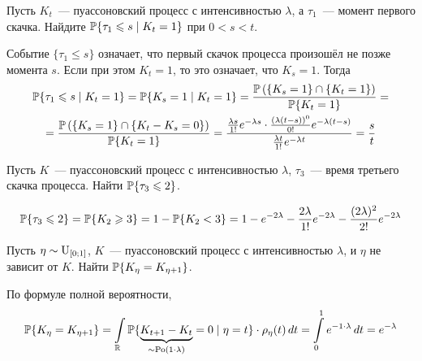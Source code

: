 \begin{exercise}
    \label{exercise:special:Poisson_process_first_event_conditional}
    Пусть $ K_t $~--- пуассоновский процесс с интенсивностью $ \lambda $,
    а $ \tau_1 $~--- момент первого скачка.
    Найдите $ \mathbb{P}\{\tau_1 \leqslant s \mid K_t = 1\} $ при $ 0 < s < t $.
\end{exercise}

\begin{solution}
    Событие $ \{ \tau_1 \leqslant s \} $ означает, что первый скачок процесса произошёл не позже момента $ s $.
    Если при этом $ K_t = 1 $, то это означает, что $ K_s = 1 $.
    Тогда
    \begin{multline*}
        \mathbb{P} \{\tau_1 \leqslant s \mid K_t = 1 \} = \mathbb{P} \{K_s = 1 \mid K_t = 1\} = \frac{\mathbb{P}\left( \{K_s = 1\} \cap \{K_t = 1\} \right)}{\mathbb{P} \{K_t = 1 \}} = \\
        = \frac{\mathbb{P}\left( \{K_s = 1\} \cap \{K_t - K_s = 0\} \right)}{\mathbb{P}\{K_t = 1\}}
        = \frac{\frac{\lambda s}{1!} e^{-\lambda s} \cdot \frac{(\lambda(t - s))^0}{0!} e^{-\lambda(t - s)}}{\frac{\lambda t}{1!} e^{-\lambda t}} = \frac{s}{t}
    \end{multline*}
\end{solution}


\begin{exercise}
    \label{exercise:special:Poisson_process_third_event}
    Пусть $ K $~--- пуассоновский процесс с интенсивностью $ \lambda $, $ \tau_3 $~--- время третьего скачка процесса.
    Найти $ \mathbb{P} \{\tau_3 \leqslant 2 \} $.
\end{exercise}

\begin{solution}
    \noindent
    \[
        \mathbb{P} \{ \tau_3 \leqslant 2 \} = \mathbb{P} \{ K_2 \geqslant 3 \} = 1 - \mathbb{P} \{ K_2 < 3 \} = 1 - e^{-2 \lambda} - \frac{2 \lambda}{1!} e^{-2 \lambda} - \frac{(2 \lambda)^2}{2!} e^{-2 \lambda}
    \]
\end{solution}


\begin{exercise}
    \label{exercise:special:Poisson_process_no_event}
    Пусть $ \eta \sim \textnormal{U}_{[0; 1]} $,
    $ K $~--- пуассоновский процесс с интенсивностью $ \lambda $, и $ \eta $ не зависит от $ K $.
    Найти $ \mathbb{P}\{K_\eta = K_{\eta + 1}\} $.
\end{exercise}

\begin{solution}
    По формуле полной вероятности,
    \[
        \mathbb{P} \{K_\eta = K_{\eta + 1}\} = \int\limits_{\mathbb{R}} \mathbb{P}\{\underbrace{K_{t + 1} - K_t}_{\sim \textnormal{Po}(1 \cdot \lambda)} = 0 \mid \eta = t\} \cdot \rho_\eta(t) \, dt =
        \int\limits_0^1 e^{-1 \cdot \lambda} \, dt = e^{-\lambda}
    \]
\end{solution}

